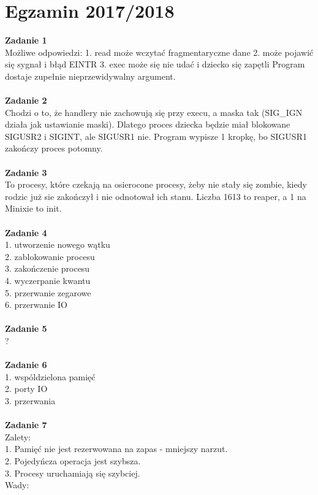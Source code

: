 \documentclass[12pt, a4paper, polish, openany]{book}
\begin{document}
\section{Egzamin 2017/2018}
\textbf{Zadanie 1} \\
Możliwe odpowiedzi:
1. read może wczytać fragmentaryczne dane
2. może pojawić się sygnał i błąd EINTR
3. exec może się nie udać i dziecko się zapętli
Program dostaje zupełnie nieprzewidywalny argument. \\\\
\textbf{Zadanie 2} \\
Chodzi o to, że handlery nie zachowują się przy execu, a maska tak (SIG\_IGN działa jak ustawianie maski). Dlatego proces dziecka będzie miał blokowane SIGUSR2 i SIGINT, ale SIGUSR1 nie. Program wypisze 1 kropkę, bo SIGUSR1 zakończy proces potomny. \\\\
\textbf{Zadanie 3} \\
To procesy, które czekają na osierocone procesy, żeby nie stały się zombie, kiedy rodzic  już sie zakończył i nie odnotował ich stanu. Liczba 1613 to reaper, a 1 na Minixie to init. \\\\
\textbf{Zadanie 4} \\
1. utworzenie nowego wątku \\
2. zablokowanie procesu \\
3. zakończenie procesu \\
4. wyczerpanie kwantu \\
5. przerwanie zegarowe \\
6. przerwanie IO \\\\
\textbf{Zadanie 5} \\
? \\\\
\textbf{Zadanie 6} \\
1. wspóldzielona pamięć \\
2. porty IO \\
3. przerwania \\\\
\textbf{Zadanie 7} \\
Zalety: \\
1. Pamięć nie jest rezerwowana na zapas - mniejszy narzut. \\
2. Pojedyńcza operacja jest szybsza. \\
3. Procesy uruchamiają się szybciej. \\
Wady: \\
\end{document}
